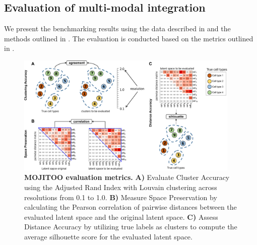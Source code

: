 \subsection{Evaluation of multi-modal integration}
We present the benchmarking results using the data described in  and the methods outlined in . The evaluation is conducted based on the metrics outlined in .

\begin{figure}[!ht]
	\centering
	\includegraphics[width=0.95\textwidth]{MOJITOO_bench_metrics/fig}
	\vspace{0.1cm}
	\caption[MOJITOO evaluation metrics]{
	\textbf{MOJITOO evaluation metrics.}  \textbf{A)} Evaluate Cluster Accuracy using the Adjusted Rand Index with Louvain clustering across resolutions from 0.1 to 1.0. \textbf{B)} Measure Space Preservation by calculating the Pearson correlation of pairwise distances between the evaluated latent space and the original latent space. \textbf{C)} Assess Distance Accuracy by utilizing true labels as clusters to compute the average silhouette score for the evaluated latent space.}
	\label{fig:bench_metrics}
\end{figure}

